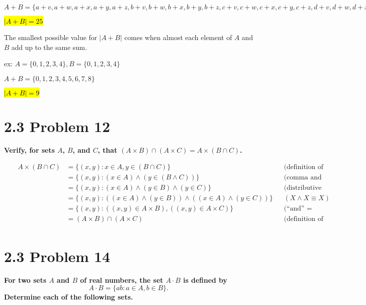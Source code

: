 \documentclass[10pt]{article}
\def \n {\par \vspace{\baselineskip}}
\begin{document}
$A + B = \{a+v, a+w, a+x, a+y, a+z, b+v, b+w, b+x, b+y, b+z, c+v, c+w, c+x, c+y, c+z,
d+v, d+w, d+x, d+y, d+z, e+v, e+w, e+x, e+y, e+z\}$

\hl{$|A + B| = 25$}

\par \vspace{\baselineskip}

The smallest possible value for $|A + B|$ comes when almost each element of $A$ and $B$ add
up to the same sum.

\par \vspace{\baselineskip}

ex: $A = \{0,1,2,3,4\}, B = \{0,1,2,3,4\}$

$A + B = \{0,1,2,3,4,5,6,7,8\}$

\hl{$|A + B| = 9$}

\n
\n
\n
\n
\n



\section{2.3 Problem 12}
\textbf{Verify, for sets $A$, $B$, and $C$, that $(A \times B) \cap (A \times C) = A \times (B \cap C)$.}

\begin{align*}
    && A \times (B \cap C) &= \{(x,y) : x \in A, y \in (B \cap C)\} && 
    \text{(definition of the product between sets)} \\
    && &= \{(x,y) : (x \in A) \wedge (y \in (B \wedge C))\} && \text{(comma and intercept = ``and'')} \\
    && &= \{(x,y) : (x \in A) \wedge (y \in B) \wedge (y \in C)\} && \text{(distributive property)} \\
    && &= \{(x,y) : ((x \in A) \wedge (y \in B)) \wedge ((x \in A) \wedge (y \in C))\} &&
    (X \wedge X \equiv X) \\
    && &= \{(x,y) : ((x,y) \in A \times B) , ((x,y) \in A \times C)\} && 
    \text{(``and'' = comma)} \\
    && &= (A \times B) \cap (A \times C) && \text{(definition of the product between sets)} \\
\end{align*}



\section{2.3 Problem 14}
\textbf{For two sets $A$ and $B$ of real numbers, the set $A \cdot B$ is defined by
$$A \cdot B = \{ab : a \in A, b \in B\}.$$ Determine each of the following sets.}
\end{document}
